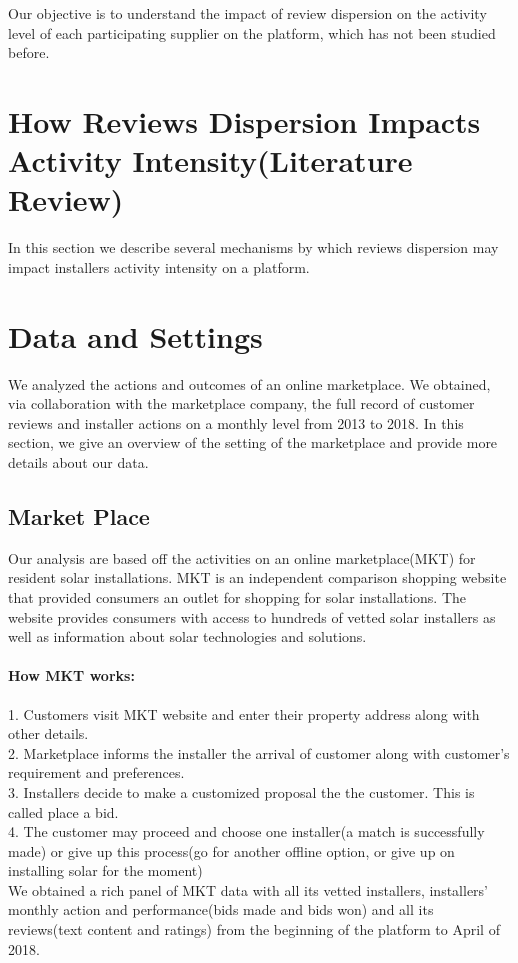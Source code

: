 \documentclass[msom,blindrev]{informs3}
\begin{document}
Our objective is to understand the impact of review dispersion on the activity level of each participating supplier on the platform, which has not been studied before.



\section{How Reviews Dispersion Impacts Activity Intensity(Literature Review) }
 In this section we describe several mechanisms by which reviews dispersion may impact installers activity intensity on a platform. 
\section{Data and Settings}
We analyzed the actions and outcomes of an online marketplace. We obtained, via collaboration with the marketplace company, the full record of customer reviews and installer actions on a monthly level from 2013 to 2018. In this section, we give an overview of the setting of the marketplace and provide more details about our data. 
\subsection{Market Place}
Our analysis are based off the activities on an online marketplace(MKT) for resident solar installations. MKT is an independent comparison shopping website that provided consumers an outlet for shopping for solar installations. The website provides consumers with access to hundreds of vetted solar installers as well as information about solar technologies and solutions. 

\paragraph{How MKT works:}
1. Customers visit MKT website and enter their property address along with other details.  \\
2. Marketplace informs the installer the arrival of customer along with customer's requirement and preferences. \\
3. Installers decide to make a customized proposal the the customer. This is called place a bid. \\
4. The customer may proceed and choose one installer(a match is successfully made) or give up this process(go for another offline option, or give up on installing solar for the moment) \\ 
We obtained a rich panel of MKT data with all its vetted installers, installers' monthly action and performance(bids made and bids won) and all its reviews(text content and ratings) from the beginning of the platform to April of 2018. 
\end{document}
